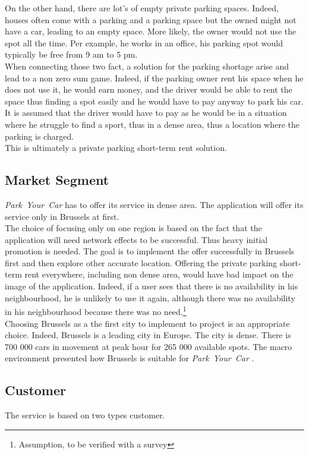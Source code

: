 \documentclass[12pt,a4paper,oneside]{book}
\newcommand{\bp}{\textit{Park~Your~Car }}
\begin{document}
On the other hand, there are lot's of empty private parking spaces. Indeed, houses often come with a parking and a parking space but the owned might not have a car, leading to an empty space. More likely, the owner would not use the spot all the time. Per example, he works in an office, his parking spot would typically be free from 9 am to 5 pm.\\

When connecting those two fact, a solution for the parking shortage arise and lead to a non zero sum game. Indeed, if the parking owner rent his space when he does not use it, he would earn money, and the driver would be able to rent the space thus finding a spot easily and he would have to pay anyway to park his car. It is assumed that the driver would have to pay as he would be in a situation where he struggle to find a sport, thus in a dense area, thus a location where the parking is charged.\\

This is ultimately a private parking short-term rent solution.

\subsection{Market Segment}
\bp has to offer its service in dense area. The application will offer its service only in Brussels at first.\\

The choice of focusing only on one region is based on the fact that the application will need network effects to be successful. Thus heavy initial promotion is needed. The goal is to implement the offer successfully in Brussels first and then explore other accurate location. Offering the private parking short-term rent everywhere, including non dense area, would have bad impact on the image of the application. Indeed, if a user sees that there is no availability in his neighbourhood, he is unlikely to use it again, although there was no availability in his neighbourhood because there was no need.\footnote{Assumption, to be verified with a survey} \\

Choosing Brussels as a the first city to implement to project is an appropriate choice. Indeed, Brussels is a leading city in Europe. The city is dense. There is 700 000 cars in movement at peak hour for 265 000 available spots.\cite{parkbx} The macro environment presented how Brussels is suitable for \bp.

\subsection{Customer}
The service is based on two types customer.\\
\end{document}

